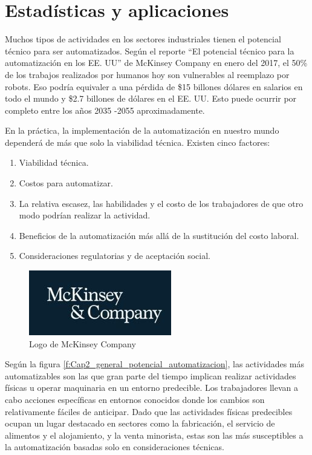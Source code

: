                \newpage


\section{Estadísticas y aplicaciones}

    Muchos tipos de actividades en los sectores industriales tienen el potencial técnico para ser automatizados. Según el reporte ``El potencial técnico para la automatización en los EE. UU'' de McKinsey Company en enero del 2017, el 50\% de los trabajos realizados por humanos hoy son vulnerables al reemplazo por robots. Eso podría equivaler a una pérdida de \$15 billones dólares en salarios en todo el mundo y \$2.7 billones de dólares en el EE. UU. Esto puede ocurrir por completo entre los años 2035 -2055 aproximadamente. 
    
    En la práctica, la implementación de la automatización en nuestro mundo dependerá de más que solo la viabilidad técnica. Existen cinco factores:

        \begin{enumerate}
           \item {Viabilidad técnica.}
            \item {Costos para automatizar.}
            \item {La relativa escasez, las habilidades y el costo de los trabajadores de que otro modo podrían realizar la actividad.}
           \item {Beneficios de la automatización más allá de la sustitución del costo laboral.}
            \item {Consideraciones regulatorias y de aceptación social.}
    \end{enumerate}
    
    \begin{figure}[h]
        \centering
        \includegraphics[width=0.2\linewidth]{Main/Chapter2/Images2/LOGOMCKINSEY.jpg}
        \caption{Logo de McKinsey Company \cite{mckinsey}}
        \label{f:Cap2_general_potencial_automatizacion_11}
    \end{figure}
    
    Según la figura \eqref{f:Cap2_general_potencial_automatizacion}, las actividades más automatizables son las que gran parte del tiempo implican realizar actividades físicas u operar maquinaria en un entorno predecible. Los trabajadores llevan a cabo acciones específicas en entornos conocidos donde los cambios son relativamente fáciles de anticipar. Dado que las actividades físicas predecibles ocupan un lugar destacado en sectores como la fabricación, el servicio de alimentos y el alojamiento, y la venta minorista, estas son las más susceptibles a la automatización basadas solo en consideraciones técnicas.
    
